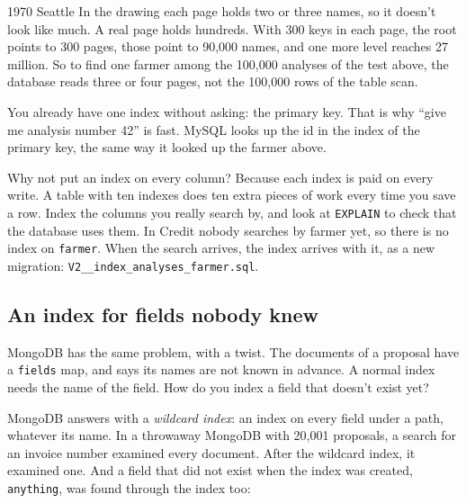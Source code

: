 \begin{history}{1970 \textperiodcentered{} Seattle}
In the drawing each page holds two or three names, so it doesn't look like
much. A real page holds hundreds. With 300 keys in each page, the root points
to 300 pages, those point to 90,000 names, and one more level reaches 27
million. So to find one farmer among the 100,000 analyses of the test above,
the database reads three or four pages, not the 100,000 rows of the table
scan.
\end{history}

You already have one index without asking: the primary key. That is why
``give me analysis number 42'' is fast. MySQL looks up the id in the index of
the primary key, the same way it looked up the farmer above.

\begin{question}{Why not put an index on every column?}
Because each index is paid on every write. A table with ten indexes does ten
extra pieces of work every time you save a row. Index the columns you really
search by, and look at \texttt{EXPLAIN} to check that the database uses them.
In Credit nobody searches by farmer yet, so there is no index on
\texttt{farmer}. When the search arrives, the index arrives with it, as a
new migration: \texttt{V2\_\_index\_analyses\_farmer.sql}.
\end{question}

\subsection*{An index for fields nobody knew}

MongoDB has the same problem, with a twist. The documents of a proposal have
a \texttt{fields} map, and  says its names are not known in
advance. A normal index needs the name of the field. How do you index a field
that doesn't exist yet?

MongoDB answers with a \emph{wildcard index}: an index on every field under a
path, whatever its name. In a throwaway MongoDB with 20,001 proposals, a
search for an invoice number examined every document. After the wildcard
index, it examined one. And a field that did not exist when the index was
created, \texttt{anything}, was found through the index too:


